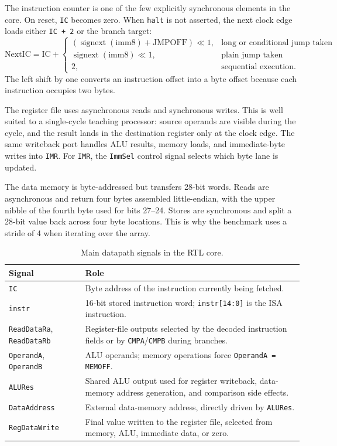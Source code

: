 \documentclass[12pt,a4paper]{article}
\begin{document}
The instruction counter is one of the few explicitly synchronous elements in the core. On reset, \texttt{IC} becomes zero. When \texttt{halt} is not asserted, the next clock edge loads either \texttt{IC + 2} or the branch target:
\[
\mathrm{NextIC} = \mathrm{IC} +
\begin{cases}
(\operatorname{signext}(\mathrm{imm8}) + \mathrm{JMPOFF}) \ll 1, & \text{long or conditional jump taken} \\
\operatorname{signext}(\mathrm{imm8}) \ll 1, & \text{plain jump taken} \\
2, & \text{sequential execution.}
\end{cases}
\]
The left shift by one converts an instruction offset into a byte offset because each instruction occupies two bytes.

The register file uses asynchronous reads and synchronous writes. This is well suited to a single-cycle teaching processor: source operands are visible during the cycle, and the result lands in the destination register only at the clock edge. The same writeback port handles ALU results, memory loads, and immediate-byte writes into \texttt{IMR}. For \texttt{IMR}, the \texttt{ImmSel} control signal selects which byte lane is updated.

The data memory is byte-addressed but transfers 28-bit words. Reads are asynchronous and return four bytes assembled little-endian, with the upper nibble of the fourth byte used for bits 27--24. Stores are synchronous and split a 28-bit value back across four byte locations. This is why the benchmark uses a stride of 4 when iterating over the array.

\begin{table}[H]
\centering
\caption{Main datapath signals in the RTL core.}
\begin{tabularx}{\linewidth}{|l|Y|}
\hline
\textbf{Signal} & \textbf{Role} \\ \hline
\texttt{IC} & Byte address of the instruction currently being fetched. \\ \hline
\texttt{instr} & 16-bit stored instruction word; \texttt{instr[14:0]} is the ISA instruction. \\ \hline
\texttt{ReadDataRa}, \texttt{ReadDataRb} & Register-file outputs selected by the decoded instruction fields or by \texttt{CMPA}/\texttt{CMPB} during branches. \\ \hline
\texttt{OperandA}, \texttt{OperandB} & ALU operands; memory operations force \texttt{OperandA = MEMOFF}. \\ \hline
\texttt{ALURes} & Shared ALU output used for register writeback, data-memory address generation, and comparison side effects. \\ \hline
\texttt{DataAddress} & External data-memory address, directly driven by \texttt{ALURes}. \\ \hline
\texttt{RegDataWrite} & Final value written to the register file, selected from memory, ALU, immediate data, or zero. \\ \hline
\end{tabularx}
\end{table}
\end{document}
